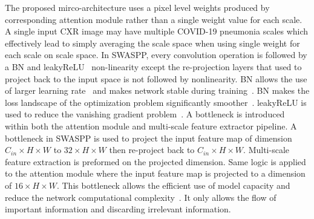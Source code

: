 The proposed mirco-architecture uses a pixel level weights produced by corresponding attention module rather than a single weight value for each scale. A single input CXR image may have multiple COVID-19 pneumonia scales which effectively lead to simply averaging the scale space when using single weight for each scale on scale space. In SWASPP, every convolution operation is followed by a BN and leakyReLU~\cite{krizhevsky2012imagenet} non-linearity except the re-projection layers that used to project back to the input space is not followed by nonlinearity. 
BN allows the use of larger learning rate~\cite{ioffe2015batch} and makes network stable during training~\cite{ioffe2015batch}. BN makes the loss landscape of the optimization problem significantly smoother~\cite{santurkar2018does}.
leakyReLU is used to reduce the vanishing gradient problem~\cite{krizhevsky2012imagenet}.
A bottleneck is introduced within both the attention module and multi-scale feature extractor pipeline. A bottleneck in SWASPP is used to project the input feature map of dimension $C_{in}\times H\times W$ to $32\times H\times W$ then re-project back to $C_{in}\times H\times W$. Multi-scale feature extraction is preformed on the projected dimension. Same logic is applied to the attention module where the input feature map is projected to a dimension of $16\times H\times W$.
This bottleneck allows the efficient use of model capacity and reduce the network computational complexity~\cite{huang2017densely}. It only allows the flow of important information and discarding irrelevant information. 

